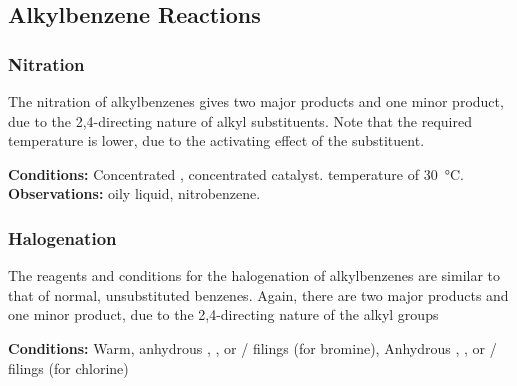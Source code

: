 		\subsection{Alkylbenzene Reactions}

			\subsubsection{Nitration}

			 	The nitration of alkylbenzenes gives two major products and one minor product, due to the 2,4-directing nature of alkyl
				substituents. Note that the required temperature is lower, due to the activating effect of the  substituent.

				\vspace{1.5em}
				\vbox{\textbf{Conditions:}	\tabto{35mm}Concentrated , concentrated  catalyst.
											\tabto{35mm} temperature of \SI{30}{\celsius}.}
				\vspace{0.75em}
				\vbox{\textbf{Observations:}\tabto{35mm} oily liquid, nitrobenzene.}




			\pagebreak
			\subsubsection{Halogenation}
				The reagents and conditions for the halogenation of alkylbenzenes are similar to that of normal, unsubstituted benzenes. Again,
				there are two major products and one minor product, due to the 2,4-directing nature of the alkyl groups

				\vspace{1.5em}
				\vbox{\textbf{Conditions:}	\tabto{35mm}Warm, anhydrous , , or  / \ch{\Al} filings (for bromine),
											\tabto{35mm}Anhydrous , , or
														 / \ch{\Al} filings (for chlorine)}

